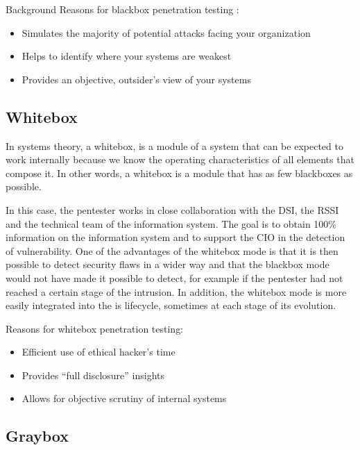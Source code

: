 \begin{chaptercover}{Background}
Reasons for blackbox penetration testing :

\begin{itemize} \vspace{-.2cm}
  \item[\checkmark] Simulates the majority of potential attacks facing your organization
  \item[\checkmark] Helps to identify where your systems are weakest
  \item[\checkmark] Provides an objective, outsider’s view of your systems
\end{itemize}

\subsection{Whitebox}

In systems theory, a whitebox, is a module of a system that can be expected to work internally because we know the operating characteristics of all elements that compose it. In other words, a whitebox is a module that has as few blackboxes as possible.

In this case, the pentester works in close collaboration with the DSI, the RSSI and the technical team of the information system. The goal is to obtain 100\% information on the information system and to support the CIO in the detection of vulnerability. One of the advantages of the whitebox mode is that it is then possible to detect security flaws in a wider way and that the blackbox mode would not have made it possible to detect, for example if the pentester had not reached a certain stage of the intrusion. In addition, the whitebox mode is more easily integrated into the \acrshort{is} lifecycle, sometimes at each stage of its evolution.

Reasons for whitebox penetration testing:
\begin{itemize} \vspace{-.2cm}
  \item[\checkmark] Efficient use of ethical hacker’s time
  \item[\checkmark] Provides “full disclosure” insights
  \item[\checkmark] Allows for objective scrutiny of internal systems
\end{itemize}

\subsection{Graybox}


\end{chaptercover}
